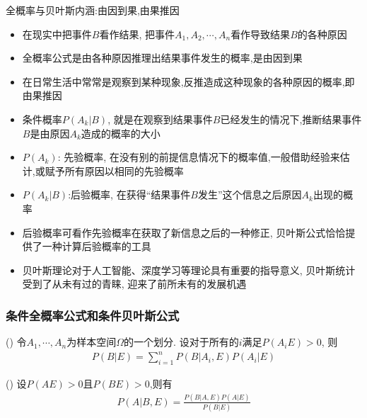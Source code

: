 \begin{frame}{全概率与贝叶斯内涵:由因到果,由果推因}
	\begin{itemize}[<+-|alert@+>]
		\item 在现实中把事件$B$看作结果, 把事件$A_1,A_2,\cdots, A_n$看作导致结果$B$的各种原因
		\item 全概率公式是由各种原因推理出结果事件发生的概率,是由因到果
		\item 在日常生活中常常是观察到某种现象,反推造成这种现象的各种原因的概率,即由果推因
		\item 条件概率$P(A_k|B)$, 就是在观察到结果事件$B$已经发生的情况下,推断结果事件$B$是由原因$A_k$造成的概率的大小
		\item $P(A_k)$: 先验概率, 在没有别的前提信息情况下的概率值,一般借助经验来估计,或赋予所有原因以相同的先验概率
		\item $P(A_k|B)$:后验概率, 在获得“结果事件$B$发生”这个信息之后原因$A_k$出现的概率
		\item 后验概率可看作先验概率在获取了新信息之后的一种修正, 贝叶斯公式恰恰提供了一种计算后验概率的工具

		\item 贝叶斯理论对于人工智能、深度学习等理论具有重要的指导意义, 贝叶斯统计受到了从未有过的青睐, 迎来了前所未有的发展机遇
	\end{itemize}
\end{frame}

\begin{frame}
  \frametitle{条件全概率公式和条件贝叶斯公式}
  \vspace{0.2cm}
    \begin{thm} () 令$A_1,\cdots,A_n$为样本空间$\Omega$的一个划分. 设对于所有的$i$满足$P(A_iE)>0$, 则
   \begin{eqnarray*}
    P(B| E)=\sum_{i=1}^{n}P(B| A_{i},E)P(A_{i}| E)
    \end{eqnarray*}
    \end{thm}
    \pause
  \vspace{0.3cm}
  \begin{thm} () 设$P(AE)>0$且$P(BE)>0$,则有
   \begin{eqnarray*}
    P(A| B,E)=\frac{P(B| A,E)P(A| E)}{P(B| E)}
    \end{eqnarray*}
    \end{thm}

\end{frame}









